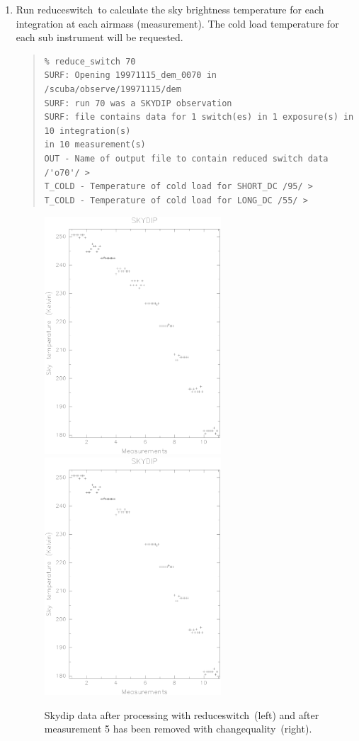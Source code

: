 \documentclass[twoside,11pt]{article}
\newcommand{\task}[1]{{\sf #1}}
\newcommand{\chgqual}{\htmlref{\task{change\_quality}}{CHANGE_QUALITY}}
\newcommand{\resw}{\htmlref{\task{reduce\_switch}}{REDUCE_SWITCH}}
\newenvironment{myquote}{\begin{quote}\begin{small}}{\end{small}\end{quote}}
\newcommand{\htmlref}[2]{#1}
\renewcommand{\_}{\texttt{\symbol{95}}}
\begin{document}
\begin{enumerate}

\item Run \resw\ to calculate the sky brightness temperature for each
integration at each airmass (measurement). The cold load temperature for each
sub instrument will be requested.
\begin{myquote}
\begin{verbatim}
% reduce_switch 70
SURF: Opening 19971115_dem_0070 in /scuba/observe/19971115/dem
SURF: run 70 was a SKYDIP observation
SURF: file contains data for 1 switch(es) in 1 exposure(s) in 10 integration(s)
in 10 measurement(s)
OUT - Name of output file to contain reduced switch data /'o70'/ > 
T_COLD - Temperature of cold load for SHORT_DC /95/ > 
T_COLD - Temperature of cold load for LONG_DC /55/ > 
\end{verbatim}
\end{myquote}


\begin{figure}
\begin{center}
\includegraphics[width=2.6in]{sun216_rawsdip.eps}
\includegraphics[width=2.6in]{sun216_rawsdip2.eps}
\caption{Skydip data after processing with \resw\ (left) and after measurement 
5 has been removed with \chgqual\ (right).}
\label{rawsdip}
\end{center}
\end{figure}




\end{enumerate}
\end{document}
